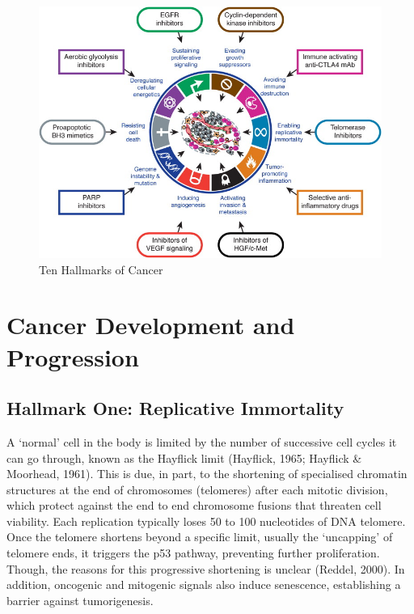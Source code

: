 \documentclass[a4paper, twoside]{templates/ociamthesis}
\begin{document}
\begin{figure}

{\centering \includegraphics[width=0.8\linewidth]{figures/hallmarks} 

}

\caption{Ten Hallmarks of Cancer}\label{fig:hallmark-figure}
\end{figure}

\hypertarget{cancer-development-and-progression}{%
\section{Cancer Development and Progression}\label{cancer-development-and-progression}}

\hypertarget{hallmark-one-replicative-immortality}{%
\subsection{Hallmark One: Replicative Immortality}\label{hallmark-one-replicative-immortality}}

A `normal' cell in the body is limited by the number of successive cell cycles it can go through, known as the Hayflick limit (Hayflick, 1965; Hayflick \& Moorhead, 1961). This is due, in part, to the shortening of specialised chromatin structures at the end of chromosomes (telomeres) after each mitotic division, which protect against the end to end chromosome fusions that threaten cell viability. Each replication typically loses 50 to 100 nucleotides of DNA telomere. Once the telomere shortens beyond a specific limit, usually the `uncapping' of telomere ends, it triggers the p53 pathway, preventing further proliferation. Though, the reasons for this progressive shortening is unclear (Reddel, 2000). In addition, oncogenic and mitogenic signals also induce senescence, establishing a barrier against tumorigenesis.
\end{document}

